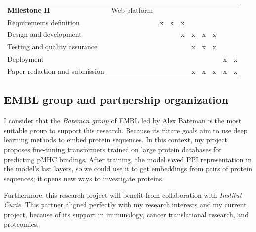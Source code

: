 \documentclass[a4paper,11pt]{article}
\begin{document}
\begin{table}[H]
{\begin{tabular}{|p{7.4cm}|p{2.3cm}|c|c|c|c|c|c|c|c|}
			\textbf{Milestone II} & Web platform & & & & & & & & \\
			Requirements definition &  &     x                &    x                    &            x             &                       &                      &                       &                               &                   \\
			Design and development &  &                     &                        &                 x        & x                      & x                     & x                      &                               &                   \\
			Testing and quality assurance &  &                     &                        &                         & x                      & x                     & x                      &                               &                   \\
			Deployment  &                                      &                       &                        &                         &                        &                      &                       & x                                         & x    \\
			Paper redaction and submission    &                              &                       &                        &                         &              x         &             x         &                x       & x                                       & x     \\ \hline
		\end{tabular}
	}
\end{table}

\subsection{EMBL group and partnership organization}
I consider that the \textit{Bateman group} of EMBL led by Alex Bateman is the most suitable group to support this research. Because its future goals aim to use deep learning methods to embed protein sequences. In this context, my project proposes fine-tuning transformers trained on large protein databases for predicting pMHC bindings. After training, the model saved PPI representation in the model's last layers, so we could use it to get embeddings from pairs of protein sequences; it opens new ways to investigate proteins.


Furthermore, this research project will benefit from collaboration with 
\textit{Institut Curie}. This partner aligned perfectly with my research interests and my current project, because of its support in immunology, cancer translational research, and proteomics.
\end{document}
